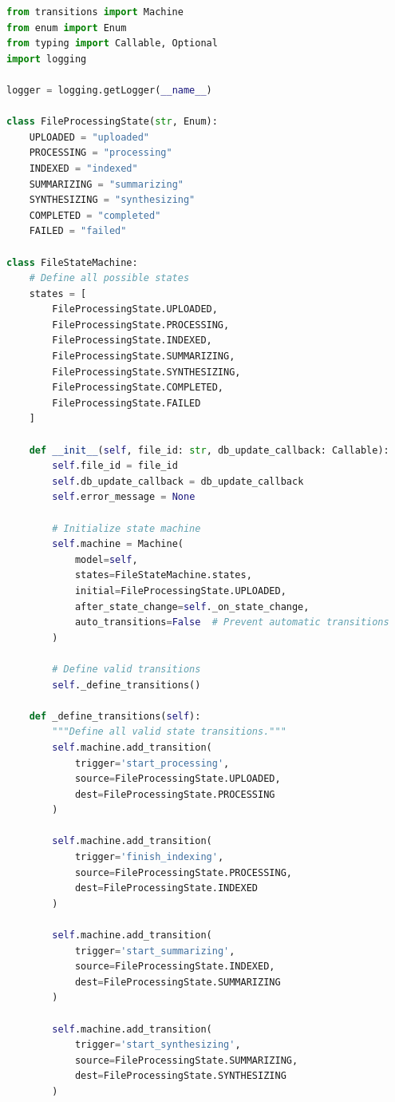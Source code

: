 \documentclass[11pt,a4paper]{article}
\begin{document}
\begin{lstlisting}[language=Python, caption={State Machine Pattern Implementation}]
from transitions import Machine
from enum import Enum
from typing import Callable, Optional
import logging

logger = logging.getLogger(__name__)

class FileProcessingState(str, Enum):
    UPLOADED = "uploaded"
    PROCESSING = "processing"
    INDEXED = "indexed"
    SUMMARIZING = "summarizing"
    SYNTHESIZING = "synthesizing"
    COMPLETED = "completed"
    FAILED = "failed"

class FileStateMachine:
    # Define all possible states
    states = [
        FileProcessingState.UPLOADED,
        FileProcessingState.PROCESSING,
        FileProcessingState.INDEXED,
        FileProcessingState.SUMMARIZING,
        FileProcessingState.SYNTHESIZING,
        FileProcessingState.COMPLETED,
        FileProcessingState.FAILED
    ]

    def __init__(self, file_id: str, db_update_callback: Callable):
        self.file_id = file_id
        self.db_update_callback = db_update_callback
        self.error_message = None

        # Initialize state machine
        self.machine = Machine(
            model=self,
            states=FileStateMachine.states,
            initial=FileProcessingState.UPLOADED,
            after_state_change=self._on_state_change,
            auto_transitions=False  # Prevent automatic transitions
        )

        # Define valid transitions
        self._define_transitions()

    def _define_transitions(self):
        """Define all valid state transitions."""
        self.machine.add_transition(
            trigger='start_processing',
            source=FileProcessingState.UPLOADED,
            dest=FileProcessingState.PROCESSING
        )

        self.machine.add_transition(
            trigger='finish_indexing',
            source=FileProcessingState.PROCESSING,
            dest=FileProcessingState.INDEXED
        )

        self.machine.add_transition(
            trigger='start_summarizing',
            source=FileProcessingState.INDEXED,
            dest=FileProcessingState.SUMMARIZING
        )

        self.machine.add_transition(
            trigger='start_synthesizing',
            source=FileProcessingState.SUMMARIZING,
            dest=FileProcessingState.SYNTHESIZING
        )


\end{lstlisting}
\end{document}
